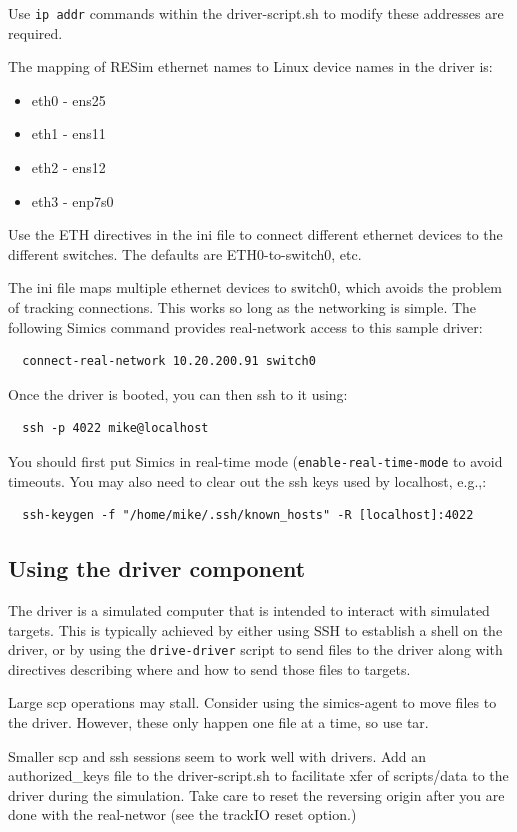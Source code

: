 \documentclass[titlepage]{article}
\begin{document}
\begin{appendices}
Use {\tt ip addr} commands within the driver-script.sh to modify these addresses are required.

The mapping of RESim ethernet names to Linux device names in the driver is: 

\begin{itemize}
\item eth0 - ens25
\item eth1 - ens11
\item eth2 - ens12
\item eth3 - enp7s0
\end{itemize}

Use the ETH directives in the ini file to connect different ethernet devices to the
different switches.  The defaults are ETH0-to-switch0, etc.

The ini file maps multiple ethernet devices to switch0, which avoids the problem of
tracking connections.  This works so long as the networking is simple.
The following Simics command provides real-network access to this sample driver:
\begin{verbatim}
  connect-real-network 10.20.200.91 switch0
\end{verbatim}
Once the driver is booted, you can then ssh to it using:
\begin{verbatim}
  ssh -p 4022 mike@localhost
\end{verbatim}
You should first put Simics in real-time mode ({\tt enable-real-time-mode} to avoid timeouts.  You may also need to clear out the
ssh keys used by localhost, e.g.,:
\begin{verbatim}
  ssh-keygen -f "/home/mike/.ssh/known_hosts" -R [localhost]:4022
\end{verbatim}

\subsection{Using the driver component}
The driver is a simulated computer that is intended to interact with simulated targets.  This is typically
achieved by either using SSH to establish a shell on the driver, or by using the {\tt drive-driver}
script to send files to the driver along with directives describing where and how to send those files to
targets.  

Large scp operations may stall.  Consider using the simics-agent to move files to the driver.  However,
these only happen one file at a time, so use tar.

Smaller scp and ssh sessions seem to work well with drivers.  Add an authorized\_keys file to the driver-script.sh to facilitate xfer of scripts/data to the driver
during the simulation.  Take care to reset the reversing origin after you are done with the real-networ (see the trackIO reset option.)


\end{appendices}
\end{document}
